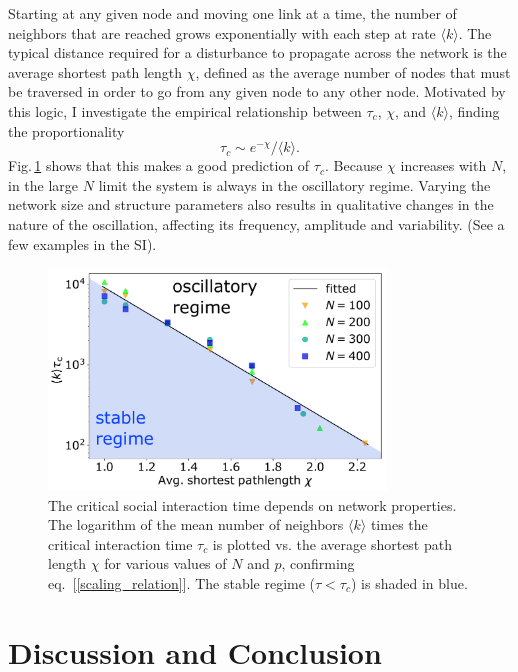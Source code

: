 Starting at any given node and moving one link at a time, the number of neighbors that are reached grows exponentially with each step at rate $\langle k \rangle$.  
The typical distance required for a disturbance to propagate across the network is the average shortest path length $\chi$, defined as the average number of nodes that must be traversed in order to go from any given node to any other node. Motivated by this logic, 
I investigate the empirical relationship between $\tau_c$, $\chi$, and $\langle k \rangle$, finding the proportionality
\begin{equation}
\tau_c \sim e^{-\chi} / \langle k \rangle.
\label{scaling_relation}
\end{equation}  
Fig.\,\ref{taucrit} shows that this makes a good prediction of $\tau_{c}$.  Because $\chi$ increases with $N$, in the large $N$ limit the system is always in the oscillatory regime. Varying the network size and structure parameters also results in qualitative changes in the nature of the oscillation, affecting its frequency, amplitude and variability.  (See a few examples in the SI).

\begin{figure}[t]
     \centering
       \includegraphics[width=0.8\textwidth]
       {figures/fig4.pdf}
	\caption{{The critical social interaction time depends on network properties.}
	The logarithm of the mean number of neighbors $\langle k \rangle$  times the critical interaction time $\tau_{c}$ is plotted vs. the average shortest path length $\chi$ for various values of $N$ and $p$, confirming eq.~[\ref{scaling_relation}]. The stable regime ($\tau \! < \! \tau_{c}$) is shaded in blue. 
   \label{taucrit}}
\end{figure}

\section{Discussion and Conclusion}

